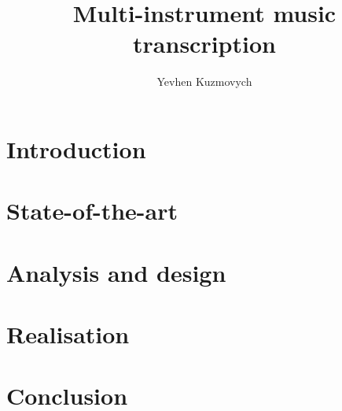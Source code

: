 \documentclass[thesis=M,english,hidelinks]{FITthesis}[2012/10/20]
\title{Multi-instrument music transcription}
\author{Yevhen Kuzmovych} %
\begin{document}

\newcommand{\smplimage}[3][1]{
\centerline{\texttt{[image: \#2.\#3]}}
}

\newcommand{\image}[4][1]{
\begin{figure}[H]
	\smplimage[#1]{#2}{#3}
	\caption{#4}
	\label{fig:#2}
\end{figure}
}


\newcommand{\class}[1]{\textit{\mbox#1}}
\newcommand{\method}[1]{\textit{\mbox#1}}
\newcommand{\field}[1]{\textit{\mbox#1}}
\newcommand{\app}[1]{\textit{\mbox#1}}
\newcommand{\file}[1]{\textit{\mbox#1}}
\newcommand{\bash}[1]{\textit{\mbox#1}}
\newcommand{\module}[1]{\textit{\mbox#1}}

\newcommand{\m}[1]{\mbox{#1}}

\newcommand{\definition}[1]{\textit{\textbf{\mbox{#1}}}}


\chapter{Introduction}\label{ch:introduction}


\chapter{State-of-the-art}\label{ch:state-of-the-art}


\chapter{Analysis and design}\label{ch:analysis-and-design}


\chapter{Realisation}\label{ch:realisation}


\chapter{Conclusion}\label{ch:conclusion}

\end{document}
